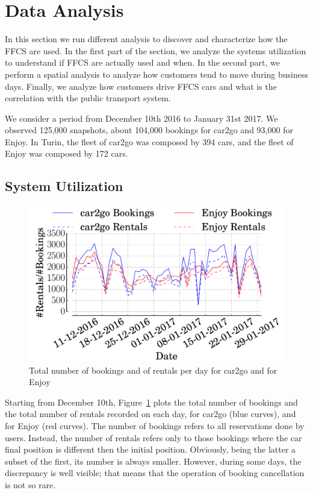 \section{Data Analysis}
\label{sec:results}

In this section we run different analysis to discover and characterize how the FFCS are used. In the first part of the section, we analyze the systems utilization to understand if FFCS are actually used and when.
In the second part, we perform a spatial analysis to analyze how customers tend to move during business days.
Finally, we analyze how customers drive FFCS cars and what is the correlation with the public transport system.


We consider a period from December 10th 2016 to January 31st 2017. We observed 125,000 snapshots, about 104,000 bookings for car2go and 93,000 for Enjoy. In Turin, the fleet of car2go was composed by 394 cars, and the fleet of Enjoy was composed by 172 cars.


\subsection{System Utilization}


\begin{figure}
\centering
 \includegraphics[width=0.85\columnwidth]{figures/bookings.pdf}
 \caption{Total number of bookings and of rentals per day for car2go and for Enjoy \label{fig:bookings}}
\end{figure}

Starting from December 10th, Figure~\ref{fig:bookings} plots the total number of bookings and the total number of rentals recorded on each day, for car2go (blue curves), and for Enjoy (red curves). The number of bookings refers to all reservations done by users. Instead, the number of rentals refers only to those bookings where the car final position is different then the initial position.
Obviously, being the latter a subset of the first, its number is always smaller. However, during some days, the discrepancy is well visible; that means that the operation of booking cancellation is not so rare.

